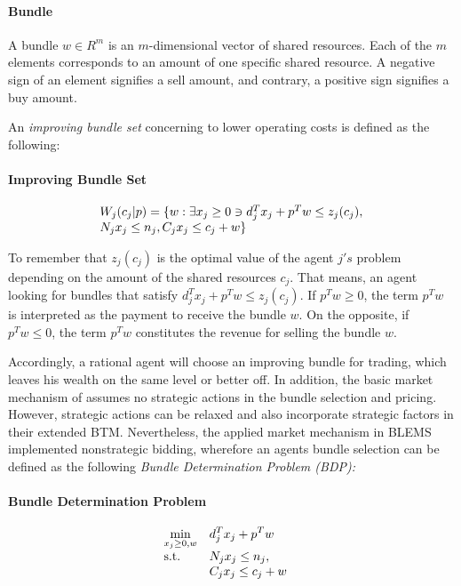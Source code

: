 \paragraph*{Bundle} A bundle $w \in R^{m}$ is an $m$-dimensional vector of shared resources. 
Each of the $m$ elements corresponds to an amount of one specific shared resource. 
A negative sign of an element signifies a sell amount, 
and contrary, a positive sign signifies a buy amount. \newline


An \textit{improving bundle set} concerning to lower operating costs is defined as the following:

\paragraph*{Improving Bundle Set}
\begin{equation}
 \begin{array}{ll@{}ll}
 W_{j}(c_{j}|p) = \{w: \exists x_{j} \geq 0 \ni d_{j}^{T}x_{j} + p^{T}w \leq z_{j}(c_{j}), \\
 N_{j}x_{j} \leq n_{j}, C_{j}x_{j} \leq c_{j}+w \}
 \end{array}
\end{equation}

To remember that $z_{j}(c_{j})$ is the optimal value of the agent $j's$ problem depending on the amount of the shared resources $c_{j}$. 
That means, an agent looking for bundles that satisfy 
$d_{j}^{T}x_{j} + p^{T}w \leq z_{j}(c_{j})$. If 
$p^{T}w \geq 0$, the term $p^{T}w$ is interpreted as the payment to receive the bundle $w$.
On the opposite, if $p^{T}w \leq 0$, the term $p^{T}w$ constitutes the revenue for selling the bundle $w$.


Accordingly, a rational agent will choose an improving bundle for trading, 
which leaves his wealth on the same level or better off. 
In addition, the basic market mechanism of  assumes no 
strategic actions in the bundle selection and pricing. However, strategic actions 
can be relaxed and  also incorporate strategic factors
in their extended BTM. 
Nevertheless, the applied market mechanism in BLEMS implemented nonstrategic bidding, wherefore an agents bundle selection 
can be defined as the following \textit{Bundle Determination Problem (BDP):}

\paragraph*{Bundle Determination Problem}
\begin{equation}
 \begin{array}{ll@{}ll}
 \underset{x_{j} \geq 0, w}{\text{min}} & \displaystyle d^{T}_{j}x_{j} + p^{T}w &\\
 \text{s.t.}& \displaystyle N_{j}x_{j} \leq n_{j}, &&\\
 & \displaystyle C_{j}x_{j} \leq c_{j}+w
 \end{array}
\end{equation}

